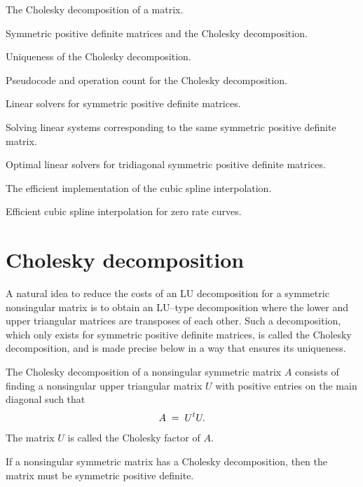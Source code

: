 
\noindent The Cholesky decomposition of a matrix.
\medskip

\noindent Symmetric positive definite matrices and the Cholesky decomposition.
\medskip

\noindent Uniqueness of the Cholesky decomposition.
\medskip

\noindent Pseudocode and operation count for the Cholesky decomposition.
\medskip

\noindent Linear solvers for symmetric positive definite matrices.
\medskip

\noindent Solving linear systems corresponding to the same symmetric positive definite
matrix.
\medskip

\noindent Optimal linear solvers for tridiagonal symmetric positive definite matrices.
\medskip

\noindent The efficient implementation of the cubic spline interpolation.
\medskip

\noindent Efficient cubic spline interpolation for zero rate curves.
\medskip

\section{Cholesky decomposition}

A natural idea to reduce the costs of an LU decomposition for a symmetric nonsingular
matrix is to obtain an LU--type decomposition where the lower and upper triangular
matrices are transposes of each other. Such a decomposition, which only exists for
symmetric positive definite matrices, is called the Cholesky decomposition, and is made
precise below in a way that ensures its uniqueness.

\begin{definition}
The Cholesky decomposition of a nonsingular symmetric matrix $A$ consists of finding a
nonsingular upper triangular matrix $U$ with positive entries on the main diagonal such
that
\begin{equation}
A \;=\; U^{t} U.
\end{equation}
The matrix $U$ is called the Cholesky factor of $A$.
\end{definition}

\begin{lemma}
If a nonsingular symmetric matrix has a Cholesky decomposition, then the matrix must be
symmetric positive definite.
\end{lemma}

